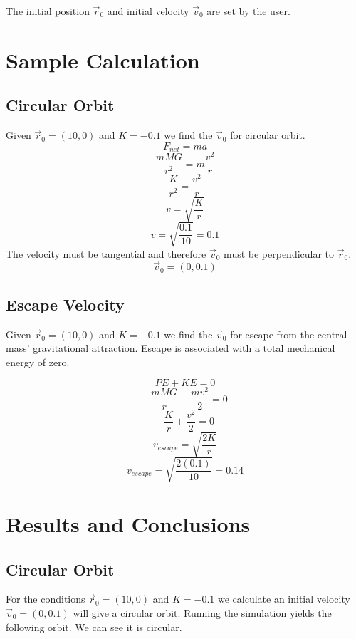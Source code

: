 \documentclass{article}
\begin{document}
The initial position $\overrightarrow{r}_0$ and initial velocity $\overrightarrow{v}_0$ are set by the user.

\newpage

\section{Sample Calculation}
\subsection{Circular Orbit}
Given $\overrightarrow{r}_0=(10,0)$ and $K=-0.1$ we find the $\overrightarrow{v}_0$ for circular orbit.
$$F_{net}=ma$$
$$ \frac{mMG}{r^2} = m \frac{v^2}{r}$$
$$ \frac{K}{r^2} = \frac{v^2}{r}$$
$$v=\sqrt{\frac{K}{r}}$$
$$v=\sqrt{\frac{0.1}{10}}=0.1$$
The velocity must be tangential and therefore $\overrightarrow{v}_0$ must be perpendicular to $\overrightarrow{r}_0$.
$$\overrightarrow{v}_0=(0,0.1)$$

\subsection{Escape Velocity}
Given $\overrightarrow{r}_0=(10,0)$ and $K=-0.1$ we find the $\overrightarrow{v}_0$ for escape from the central mass' gravitational attraction.  Escape is associated with a total mechanical energy of zero.

$$PE+KE=0$$
$$-\frac{mMG}{r}+\frac{mv^2}{2}=0 $$
$$-\frac{K}{r}+\frac{v^2}{2}=0 $$
$$v_{escape}=\sqrt{\frac{2K}{r}}$$
$$v_{escape}=\sqrt{\frac{2(0.1)}{10}}=0.14$$

\newpage 

\section{Results and Conclusions}

\subsection{Circular Orbit}
For the conditions $\overrightarrow{r}_0=(10,0)$ and $K=-0.1$ we calculate an initial velocity $\overrightarrow{v}_0=(0,0.1)$ will give a circular orbit.  Running the simulation yields the following orbit.  We can see it is circular.
\end{document}
